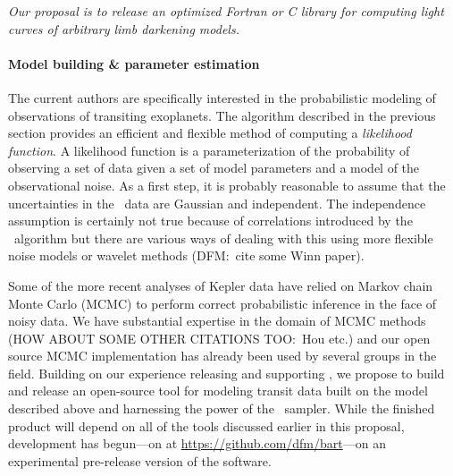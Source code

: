 \documentclass[letterpaper,12pt,preprint]{hack_aastex}
\newcommand{\Untrendy}{\package{Untrendy}}
\newcommand{\emcee}{\package{emcee}}
\begin{document}
\textit{Our proposal is to release an optimized Fortran or C library for
computing light curves of arbitrary limb darkening models.}


\paragraph{Model building \& parameter estimation}
The current authors are specifically interested in the probabilistic modeling
of observations of transiting exoplanets.
The algorithm described in the previous section provides an efficient and
flexible method of computing a \textit{likelihood function}.
A likelihood function is a parameterization of the probability of observing a
set of data given a set of model parameters and a model of the observational
noise.
As a first step, it is probably reasonable to assume that the uncertainties in
the \Kepler\ data are Gaussian and independent.
The independence assumption is certainly not true because of correlations
introduced by the \Untrendy\ algorithm but there are various ways of dealing
with this using more flexible noise models or wavelet methods (DFM:\ cite some
Winn paper).

Some of the more recent analyses of Kepler data have relied on Markov chain
Monte Carlo (MCMC) to perform correct probabilistic inference in the face of
noisy data.
We have substantial expertise in the domain of MCMC methods \citep{emcee} (HOW
ABOUT SOME OTHER CITATIONS TOO:\ Hou etc.) and our open source MCMC
implementation has already been used by several groups in the field.
Building on our experience releasing and supporting \emcee, we propose to
build and release an open-source tool for modeling transit data built on the
model described above and harnessing the power of the \emcee\ sampler.
While the finished product will depend on all of the tools discussed earlier
in this proposal, development has begun---on  at
\url{https://github.com/dfm/bart}---on an experimental pre-release version of
the software.
\end{document}

